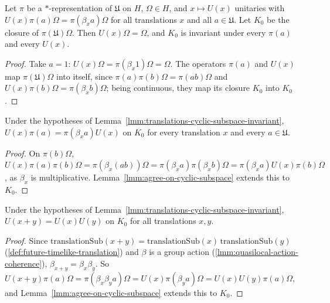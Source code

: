 \begin{lemma}
    \label{lmm:translations-cyclic-subspace-invariant}
    \leanok
    Let $\pi$ be a $*$-representation of $\mathfrak{U}$ on $H$, $\Omega \in H$, and $x \mapsto U(x)$ unitaries with $U(x)\pi(a)\Omega = \pi(\beta_x a)\Omega$ for all translations $x$ and all $a \in \mathfrak{U}$. Let $K_0$ be the closure of $\pi(\mathfrak{U})\Omega$. Then $U(x)\Omega = \Omega$, and $K_0$ is invariant under every $\pi(a)$ and every $U(x)$.
\end{lemma}
\begin{proof}
    \leanok
    Take $a = 1$: $U(x)\Omega = \pi(\beta_x 1)\Omega = \Omega$. The operators $\pi(a)$ and $U(x)$ map $\pi(\mathfrak{U})\Omega$ into itself, since $\pi(a)\pi(b)\Omega = \pi(ab)\Omega$ and $U(x)\pi(b)\Omega = \pi(\beta_x b)\Omega$; being continuous, they map its closure $K_0$ into $K_0$.
\end{proof}

\begin{lemma}
    \label{lmm:translations-intertwine-cyclic-subspace}
    \leanok
    Under the hypotheses of Lemma~\ref{lmm:translations-cyclic-subspace-invariant}, $U(x)\pi(a) = \pi(\beta_x a)U(x)$ on $K_0$ for every translation $x$ and every $a \in \mathfrak{U}$.
\end{lemma}
\begin{proof}
    \leanok
    On $\pi(b)\Omega$, $U(x)\pi(a)\pi(b)\Omega = \pi(\beta_x(ab))\Omega = \pi(\beta_x a)\pi(\beta_x b)\Omega = \pi(\beta_x a)U(x)\pi(b)\Omega$, as $\beta_x$ is multiplicative. Lemma~\ref{lmm:agree-on-cyclic-subspace} extends this to $K_0$.
\end{proof}

\begin{lemma}
    \label{lmm:translations-group-law-cyclic-subspace}
    \leanok
    Under the hypotheses of Lemma~\ref{lmm:translations-cyclic-subspace-invariant}, $U(x+y) = U(x)U(y)$ on $K_0$ for all translations $x, y$.
\end{lemma}
\begin{proof}
    \leanok
    Since $\mathrm{translationSub}(x+y) = \mathrm{translationSub}(x)\,\mathrm{translationSub}(y)$ (\ref{def:future-timelike-translation}) and $\beta$ is a group action (\ref{lmm:quasilocal-action-coherence}), $\beta_{x+y} = \beta_x\beta_y$. So $U(x+y)\pi(a)\Omega = \pi(\beta_x\beta_y a)\Omega = U(x)\pi(\beta_y a)\Omega = U(x)U(y)\pi(a)\Omega$, and Lemma~\ref{lmm:agree-on-cyclic-subspace} extends this to $K_0$.
\end{proof}

